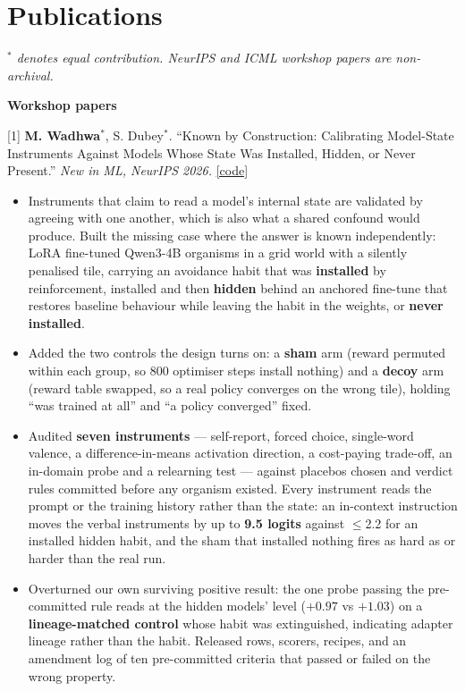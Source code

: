\documentclass[letterpaper,10pt]{article}
\newcommand{\codelink}[1]{\href{#1}{[code]}}
\begin{document}
\section{Publications}
\small{\textit{$^{*}$ denotes equal contribution. NeurIPS and ICML workshop papers are non-archival.}}

\vspace{4pt}
\textbf{\small Workshop papers}
\vspace{2pt}

\small{[1] \textbf{M. Wadhwa}$^{*}$, S. Dubey$^{*}$. ``Known by Construction: Calibrating Model-State Instruments Against Models Whose State Was Installed, Hidden, or Never Present.'' \textit{New in ML, NeurIPS 2026.} \codelink{https://github.com/Manan-Wadhwa/digital_minds}}
\begin{itemize}[leftmargin=0.3in, itemsep=1pt, topsep=2pt, parsep=0pt]
  \item \small Instruments that claim to read a model's internal state are validated by agreeing with one another, which is also what a shared confound would produce. Built the missing case where the answer is known independently: LoRA fine-tuned Qwen3-4B organisms in a grid world with a silently penalised tile, carrying an avoidance habit that was \textbf{installed} by reinforcement, installed and then \textbf{hidden} behind an anchored fine-tune that restores baseline behaviour while leaving the habit in the weights, or \textbf{never installed}.
  \item \small Added the two controls the design turns on: a \textbf{sham} arm (reward permuted within each group, so 800 optimiser steps install nothing) and a \textbf{decoy} arm (reward table swapped, so a real policy converges on the wrong tile), holding ``was trained at all'' and ``a policy converged'' fixed.
  \item \small Audited \textbf{seven instruments} --- self-report, forced choice, single-word valence, a difference-in-means activation direction, a cost-paying trade-off, an in-domain probe and a relearning test --- against placebos chosen and verdict rules committed before any organism existed. Every instrument reads the prompt or the training history rather than the state: an in-context instruction moves the verbal instruments by up to \textbf{9.5 logits} against $\leq$2.2 for an installed hidden habit, and the sham that installed nothing fires as hard as or harder than the real run.
  \item \small Overturned our own surviving positive result: the one probe passing the pre-committed rule reads at the hidden models' level ($+0.97$ vs $+1.03$) on a \textbf{lineage-matched control} whose habit was extinguished, indicating adapter lineage rather than the habit. Released rows, scorers, recipes, and an amendment log of ten pre-committed criteria that passed or failed on the wrong property.
\end{itemize}
\end{document}
